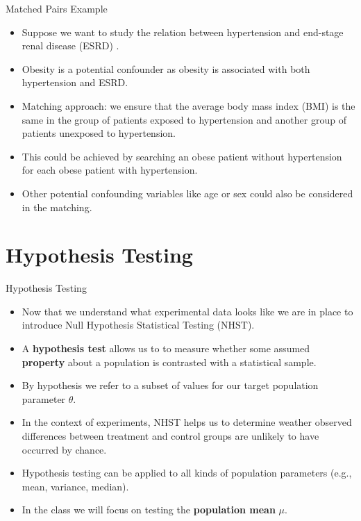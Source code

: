 \documentclass[handout]{beamer}
\begin{document}
\begin{frame}{Matched Pairs Example}
\scriptsize{

\begin{itemize}

\item Suppose we want to study the relation between hypertension and end-stage renal disease (ESRD) \cite{de2011matching}.

\item Obesity is a potential confounder as obesity is associated with both hypertension and ESRD. 

\item Matching approach: we ensure that the average body mass index (BMI) is the same in the group of patients exposed to hypertension and another group of patients unexposed to hypertension. 

\item This could be achieved by searching an obese patient without hypertension for each obese patient with hypertension.
  
\item Other potential confounding variables like age or sex could also be considered in the matching.  
  
\end{itemize}



} 
\end{frame}


\section{Hypothesis Testing}

\begin{frame}{Hypothesis Testing}
\scriptsize{
\begin{itemize}
 \item Now that we understand what experimental data looks like we are in place to introduce  Null Hypothesis Statistical Testing (NHST).
  \item A \textbf{hypothesis test} allows us to  to measure whether some assumed \textbf{property} about a population is contrasted with a statistical sample.
  \item By hypothesis we refer to a subset of values for our target population parameter $\theta$.
 \item In the context of experiments, NHST helps us to determine weather observed differences between treatment and control groups are unlikely to have occurred by chance. 
 
  \item Hypothesis testing can be applied to all kinds of population parameters (e.g., mean, variance, median).
 \item In the class we will focus on testing the \textbf{population mean} $\mu$.

\end{itemize}
} 
\end{frame}
\end{document}
